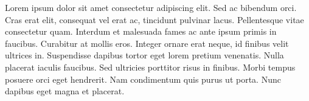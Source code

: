 \documentclass[./main.tex]{subfiles}
\begin{document}
\par Lorem ipsum dolor sit amet consectetur adipiscing elit. Sed ac bibendum orci. Cras erat elit, consequat vel erat ac, tincidunt pulvinar lacus. Pellentesque vitae consectetur quam. Interdum et malesuada fames ac ante ipsum primis in faucibus. Curabitur at mollis eros. Integer ornare erat neque, id finibus velit ultrices in. Suspendisse dapibus tortor eget lorem pretium venenatis. Nulla placerat iaculis faucibus. Sed ultricies porttitor risus in finibus. Morbi tempus posuere orci eget hendrerit. Nam condimentum quis purus ut porta. Nunc dapibus eget magna et placerat.
\end{document}

